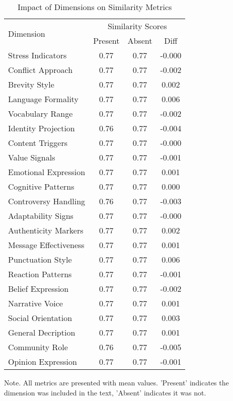 \begin{table}
\caption{Impact of Dimensions on Similarity Metrics}
\label{table2}
\begin{tabular}{lccc}
\hline
\multirow{2}{*}{Dimension} & \multicolumn{3}{c}{Similarity Scores} \\
 & Present & Absent & Diff \\
\hline
Stress Indicators & 0.77 & 0.77 & -0.000 \\
Conflict Approach & 0.77 & 0.77 & -0.002 \\
Brevity Style & 0.77 & 0.77 & 0.002 \\
Language Formality & 0.77 & 0.77 & 0.006 \\
Vocabulary Range & 0.77 & 0.77 & -0.002 \\
Identity Projection & 0.76 & 0.77 & -0.004 \\
Content Triggers & 0.77 & 0.77 & -0.000 \\
Value Signals & 0.77 & 0.77 & -0.001 \\
Emotional Expression & 0.77 & 0.77 & 0.001 \\
Cognitive Patterns & 0.77 & 0.77 & 0.000 \\
Controversy Handling & 0.76 & 0.77 & -0.003 \\
Adaptability Signs & 0.77 & 0.77 & -0.000 \\
Authenticity Markers & 0.77 & 0.77 & 0.002 \\
Message Effectiveness & 0.77 & 0.77 & 0.001 \\
Punctuation Style & 0.77 & 0.77 & 0.006 \\
Reaction Patterns & 0.77 & 0.77 & -0.001 \\
Belief Expression & 0.77 & 0.77 & -0.002 \\
Narrative Voice & 0.77 & 0.77 & 0.001 \\
Social Orientation & 0.77 & 0.77 & 0.003 \\
General Decription & 0.77 & 0.77 & 0.001 \\
Community Role & 0.76 & 0.77 & -0.005 \\
Opinion Expression & 0.77 & 0.77 & -0.001 \\
\hline
\end{tabular}
\begin{tablenotes}
\small
\item Note. All metrics are presented with mean values. 'Present' indicates the dimension was included in the text, 'Absent' indicates it was not.
\end{tablenotes}
\end{table}